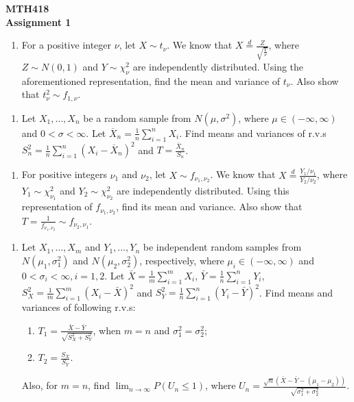 \documentclass[11pt]{article}
\begin{document}
\begin{center}
    \textbf{MTH418} \\
    \textbf{Assignment 1}
\end{center}

\begin{enumerate}
    \item[1.] For a positive integer $\nu$, let $X \sim t_\nu$. We know that $X \stackrel{d}{=} \frac{Z}{\sqrt{\frac{Y}{\nu}}}$, where $Z \sim N(0, 1)$ and $Y \sim \chi^2_\nu$ are independently distributed. Using the aforementioned representation, find the mean and variance of $t_\nu$. Also show that $t^2_\nu \sim f_{1,\nu}$.
\end{enumerate}

\begin{enumerate}
    \item[2.] Let $X_1, \dots, X_n$ be a random sample from $N(\mu, \sigma^2)$, where $\mu \in (-\infty, \infty)$ and $0 < \sigma < \infty$. Let $\overline{X}_n = \frac{1}{n} \sum_{i=1}^n X_i$. Find means and variances of r.v.s $S_n^2 = \frac{1}{n} \sum_{i=1}^n (X_i - \overline{X}_n)^2$ and $T = \frac{\overline{X}_n}{S_n}$.
\end{enumerate}

\begin{enumerate}
    \item[3.] For positive integers $\nu_1$ and $\nu_2$, let $X \sim f_{\nu_1, \nu_2}$. We know that $X \stackrel{d}{=} \frac{Y_1 / \nu_1}{Y_2 / \nu_2}$, where $Y_1 \sim \chi_{\nu_1}^2$ and $Y_2 \sim \chi_{\nu_2}^2$ are independently distributed. Using this representation of $f_{\nu_1, \nu_2}$, find its mean and variance. Also show that $T = \frac{1}{f_{\nu_1, \nu_2}} \sim f_{\nu_2, \nu_1}$.
\end{enumerate}

\begin{enumerate}
    \item[4.] Let $X_1, \dots, X_m$ and $Y_1, \dots, Y_n$ be independent random samples from $N(\mu_1, \sigma_1^2)$ and $N(\mu_2, \sigma_2^2)$, respectively, where $\mu_i \in (-\infty, \infty)$ and $0 < \sigma_i < \infty, i = 1, 2$. Let $\bar{X} = \frac{1}{m} \sum_{i=1}^m X_i$, $\bar{Y} = \frac{1}{n} \sum_{i=1}^n Y_i$, $S_X^2 = \frac{1}{m} \sum_{i=1}^m (X_i - \bar{X})^2$ and $S_Y^2 = \frac{1}{n} \sum_{i=1}^n (Y_i - \bar{Y})^2$. Find means and variances of following r.v.s:
    \begin{enumerate}
        \item[(a)] $T_1 = \frac{\bar{X} - \bar{Y}}{\sqrt{S_X^2 + S_Y^2}}$, when $m = n$ and $\sigma_1^2 = \sigma_2^2$;
        \item[(b)] $T_2 = \frac{S_X}{S_Y}$.
    \end{enumerate}
    Also, for $m = n$, find $\displaystyle \lim_{n \to \infty} P(U_n \le 1)$, where $U_n = \frac{\sqrt{n}(\bar{X} - \bar{Y} - (\mu_1 - \mu_2))}{\sqrt{\sigma_1^2 + \sigma_2^2}}$.
\end{enumerate}
\end{document}
